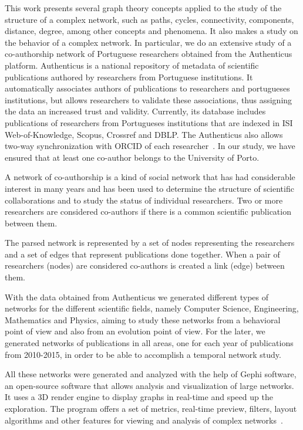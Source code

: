 \documentclass{article}
\begin{document}
\begin{multicols}{2}
This work presents several graph theory concepts applied to the study of the structure of a complex network, such as paths, cycles, connectivity, components, distance, degree, among other concepts and phenomena.
It also makes a study on the behavior of a complex network. In particular, we do an extensive study of a co-authorship network of Portuguese researchers obtained from the Authenticus platform. Authenticus is a national repository of metadata of scientific publications authored by researchers from Portuguese institutions. It automatically associates authors of publications to researchers and portugueses institutions, but allows researchers to validate these associations, thus assigning the data an increased trust and validity. Currently, its database includes publications of researchers from Portugueses institutions that are indexed in ISI Web-of-Knowledge, Scopus, Crossref and DBLP. The Authenticus also allows two-way synchronization with ORCID of each researcher~\cite{Authenticus}. In our study, we have ensured that at least one co-author belongs to the University of Porto.

A network of co-authorship is a kind of social network that has had considerable interest in many years and has been used to determine the structure of scientific collaborations and to study the status of individual researchers\cite{liu2005co}. Two or more researchers are considered co-authors if there is a common scientific publication between them.

The parsed network is represented by a set of nodes representing the researchers and a set of edges that represent publications done together. When a pair of researchers (nodes) are considered co-authors is created a link (edge) between them.

With the data obtained from Authenticus we generated different types of networks for the different scientific fields, namely Computer Science, Engineering, Mathematics and Physics, aiming to study these networks from a behavioral point of view and also from an evolution point of view. For the later, we generated networks of publications in all areas, one for each year of publications from 2010-2015, in order to be able to accomplish a temporal network study.

All these networks were generated and analyzed with the help of Gephi software, an open-source software that allows analysis and visualization of large networks. It uses a 3D render engine to display graphs in real-time and speed up the exploration. The program offers a set of metrics, real-time preview, filters, layout algorithms and other features for viewing and analysis of complex networks~\cite{Gephi}.


\end{multicols}
\end{document}
